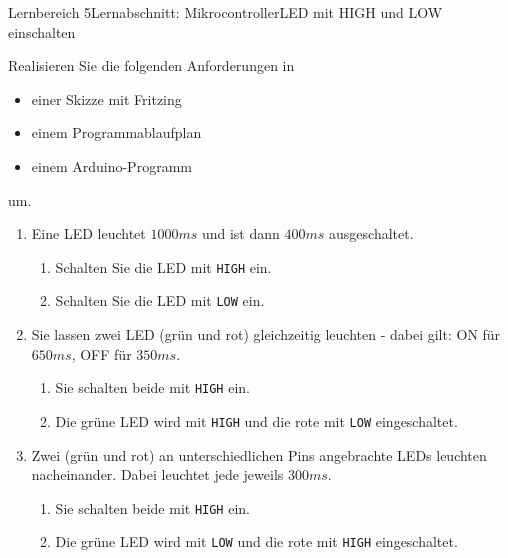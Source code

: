 \documentclass[oneside,openany,headings=optiontotoc,11pt,numbers=noenddot]{scrreprt}
\begin{document}
		\begin{worksheet}{Lernbereich 5}{Lernabschnitt: Mikrocontroller}{LED mit HIGH und LOW einschalten}
			\begin{framed}
				\noindent
				Realisieren Sie die folgenden Anforderungen in
				\begin{itemize}[label=-]
					\item einer Skizze mit Fritzing
					\item einem Programmablaufplan
					\item einem Arduino-Programm
				\end{itemize}
				um.
				\begin{enumerate}
					\item Eine LED leuchtet \(1000ms\) und ist dann \(400ms\) ausgeschaltet.
					\begin{enumerate}[label=(\alph*)]
						\item Schalten Sie die LED mit {\lstinline[style=Arduino]|HIGH|} ein.
						\item Schalten Sie die LED mit {\lstinline[style=Arduino]|LOW|} ein.
					\end{enumerate}
					\item Sie lassen zwei LED (grün und rot) gleichzeitig leuchten - dabei gilt: ON für \(650ms\), OFF für \(350ms\).
					\begin{enumerate}[label=(\alph*)]
						\item Sie schalten beide mit \lstinline[style=Arduino]|HIGH| ein.
						\item Die grüne LED wird mit \lstinline[style=Arduino]|HIGH| und die rote mit \lstinline[style=Arduino]|LOW| eingeschaltet.
					\end{enumerate}
					\item Zwei (grün und rot) an unterschiedlichen Pins angebrachte LEDs leuchten nacheinander. Dabei leuchtet jede jeweils \(300ms\).
					\begin{enumerate}[label=(\alph*)]
						\item Sie schalten beide mit \lstinline[style=Arduino]|HIGH| ein.
						\item Die grüne LED wird mit \lstinline[style=Arduino]|LOW| und die rote mit \lstinline[style=Arduino]|HIGH| eingeschaltet.
					\end{enumerate}
				\end{enumerate}
			\end{framed}
		\end{worksheet}
\end{document}
